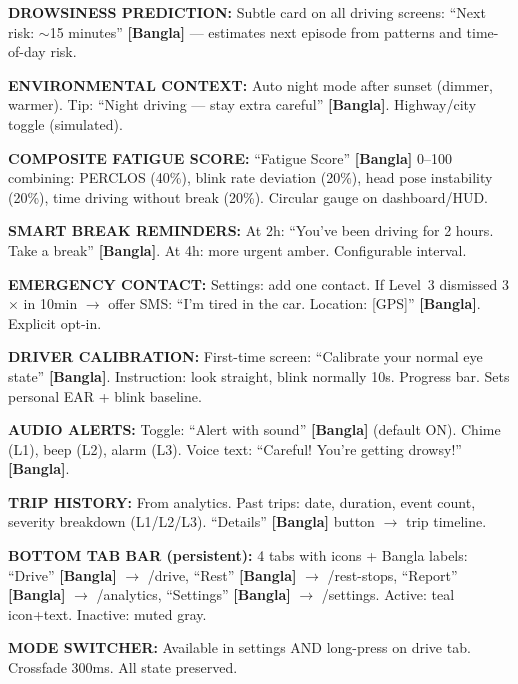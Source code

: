\documentclass[sigconf]{acmart}
\begin{document}
 
\begin{promptbox}
\textbf{DROWSINESS PREDICTION:} Subtle card on all driving screens: ``Next risk: $\sim$15 minutes'' \textbf{[Bangla]} --- estimates next episode from patterns and time-of-day risk.
 
\textbf{ENVIRONMENTAL CONTEXT:} Auto night mode after sunset (dimmer, warmer). Tip: ``Night driving --- stay extra careful'' \textbf{[Bangla]}. Highway/city toggle (simulated).
 
\textbf{COMPOSITE FATIGUE SCORE:} ``Fatigue Score'' \textbf{[Bangla]} 0--100 combining: PERCLOS (40\%), blink rate deviation (20\%), head pose instability (20\%), time driving without break (20\%). Circular gauge on dashboard/HUD.
 
\textbf{SMART BREAK REMINDERS:} At 2h: ``You've been driving for 2 hours. Take a break'' \textbf{[Bangla]}. At 4h: more urgent amber. Configurable interval.
 
\textbf{EMERGENCY CONTACT:} Settings: add one contact. If Level~3 dismissed 3$\times$ in 10min $\rightarrow$ offer SMS: ``I'm tired in the car. Location: [GPS]'' \textbf{[Bangla]}. Explicit opt-in.
 
\textbf{DRIVER CALIBRATION:} First-time screen: ``Calibrate your normal eye state'' \textbf{[Bangla]}. Instruction: look straight, blink normally 10s. Progress bar. Sets personal EAR + blink baseline.
 
\textbf{AUDIO ALERTS:} Toggle: ``Alert with sound'' \textbf{[Bangla]} (default ON). Chime (L1), beep (L2), alarm (L3). Voice text: ``Careful! You're getting drowsy!'' \textbf{[Bangla]}.
 
\textbf{TRIP HISTORY:} From analytics. Past trips: date, duration, event count, severity breakdown (L1/L2/L3). ``Details'' \textbf{[Bangla]} button $\rightarrow$ trip timeline.
 
\textbf{BOTTOM TAB BAR (persistent):} 4 tabs with icons + Bangla labels: ``Drive'' \textbf{[Bangla]} $\rightarrow$ /drive, ``Rest'' \textbf{[Bangla]} $\rightarrow$ /rest-stops, ``Report'' \textbf{[Bangla]} $\rightarrow$ /analytics, ``Settings'' \textbf{[Bangla]} $\rightarrow$ /settings. Active: teal icon+text. Inactive: muted gray.
 
\textbf{MODE SWITCHER:} Available in settings AND long-press on drive tab. Crossfade 300ms. All state preserved.
 

\end{promptbox}
\end{document}
